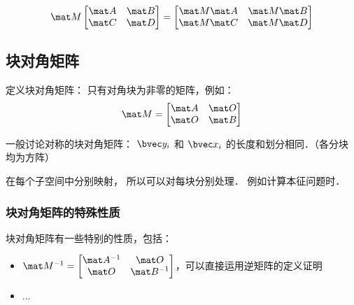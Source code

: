 \begin{equation}
\mat M
\begin{bmatrix}
\mat A & \mat B\\
\mat C & \mat D\\
\end{bmatrix}
=
\begin{bmatrix}
\mat M \mat A & \mat M \mat B\\
\mat M \mat C & \mat M \mat D\\
\end{bmatrix}
\end{equation}


\subsection{块对角矩阵}
定义块对角矩阵： 只有对角块为非零的矩阵，例如：
\begin{equation}
\mat M = 
\begin{bmatrix}
\mat A & \mat O\\
\mat O & \mat B\\
\end{bmatrix}
\end{equation}

一般讨论对称的块对角矩阵： $\bvec y_i$ 和 $\bvec x_i$ 的长度和划分相同．（各分块均为方阵）

在每个子空间中分别映射， 所以可以对每块分别处理． 例如计算本征问题时．

\subsubsection{块对角矩阵的特殊性质}
块对角矩阵有一些特别的性质，包括：
\begin{itemize}
\item $\mat M ^ {-1} = 
\begin{bmatrix}
\mat A^{-1} & \mat O\\
\mat O & \mat B^{-1}\\
\end{bmatrix}
$，可以直接运用逆矩阵的定义证明
\item ...
\end{itemize}
